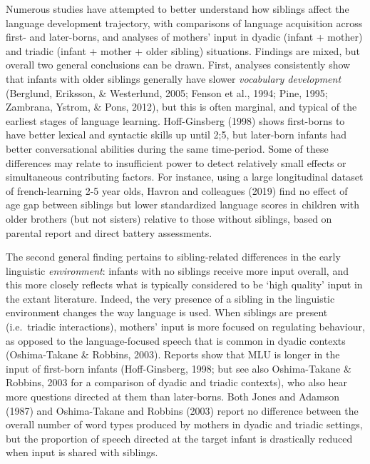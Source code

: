 \documentclass[
  man,floatsintext]{apa6}
\begin{document}
Numerous studies have attempted to better understand how siblings affect the language development trajectory, with comparisons of language acquisition across first- and later-borns, and analyses of mothers' input in dyadic (infant + mother) and triadic (infant + mother + older sibling) situations. Findings are mixed, but overall two general conclusions can be drawn. First, analyses consistently show that infants with older siblings generally have slower \emph{vocabulary development} (Berglund, Eriksson, \& Westerlund, 2005; Fenson et al., 1994; Pine, 1995; Zambrana, Ystrom, \& Pons, 2012), but this is often marginal, and typical of the earliest stages of language learning. Hoff-Ginsberg (1998) shows first-borns to have better lexical and syntactic skills up until 2;5, but later-born infants had better conversational abilities during the same time-period. Some of these differences may relate to insufficient power to detect relatively small effects or simultaneous contributing factors. For instance, using a large longitudinal dataset of french-learning 2-5 year olds, Havron and colleagues (2019) find no effect of age gap between siblings but lower standardized language scores in children with older brothers (but not sisters) relative to those without siblings, based on parental report and direct battery assessments.

The second general finding pertains to sibling-related differences in the early linguistic \emph{environment}: infants with no siblings receive more input overall, and this more closely reflects what is typically considered to be `high quality' input in the extant literature. Indeed, the very presence of a sibling in the linguistic environment changes the way language is used. When siblings are present (i.e.~triadic interactions), mothers' input is more focused on regulating behaviour, as opposed to the language-focused speech that is common in dyadic contexts (Oshima-Takane \& Robbins, 2003). Reports show that MLU is longer in the input of first-born infants (Hoff-Ginsberg, 1998; but see also Oshima-Takane \& Robbins, 2003 for a comparison of dyadic and triadic contexts), who also hear more questions directed at them than later-borns. Both Jones and Adamson (1987) and Oshima-Takane and Robbins (2003) report no difference between the overall number of word types produced by mothers in dyadic and triadic settings, but the proportion of speech directed at the target infant is drastically reduced when input is shared with siblings.
\end{document}
